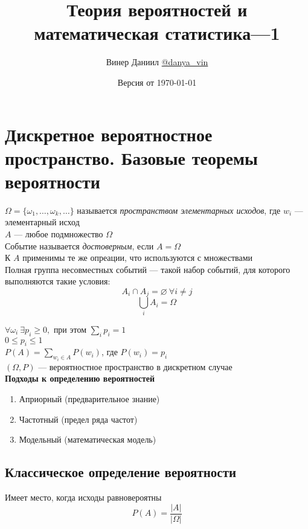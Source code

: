 \documentclass[a4paper, 10pt]{article}
\title{\LARGE{Теория вероятностей и математическая статистика—1}}
\author{Винер Даниил  \href{https://t.me/danya_vin}{@danya\_vin}}
\date{Версия от \today}
\begin{document}
\maketitle
\tableofcontents
\setlength{\parindent}{15pt}
\setlength{\parskip}{2mm}
\newpage
\section{Дискретное вероятностное пространство. Базовые теоремы вероятности}
 $\Omega=\{\omega_1,\ldots,\omega_k,\ldots\}$ называется \textit{пространством элементарных исходов}, где $w_i$ — элементарный исход\\[2mm]
 $A$ — любое подмножество $\Omega$\\[2mm]
 Событие называется \textit{достоверным}, если $A=\Omega$\\[2mm]
\comment К $A$ применимы те же опреации, что используются с множествами\\[2mm]
 Полная группа несовместных событий — такой набор событий, для которого выполняются такие условия:
\begin{equation*}
    A_i\cap A_j=\varnothing\ \forall i\ne j
\end{equation*}
\begin{equation*}
    \displaystyle\bigcup\limits_i A_i=\Omega
\end{equation*}

\axiom $\forall \omega_i\ \exists p_i\geqslant0,$ при этом $\displaystyle\sum_i p_i=1$\\[2mm]
\corollary $0\leqslant p_i\leqslant1$\\[2mm]
 $P(A)=\sum_{w_i\in A} P(w_i)$, где $P(w_i)=p_i$\\[2mm]
\indent $(\Omega, P)$ — вероятностное пространство в дискретном случае\\[2mm]
\textbf{Подходы к определению вероятностей}
\begin{enumerate}
    \item Априорный (предварительное знание)
    \item Частотный (предел ряда частот)
    \item Модельный (математическая модель)
\end{enumerate}
\subsection{Классическое определение вероятности}
\indent Имеет место, когда исходы равновероятны\\[2mm]
$$P(A)=\displaystyle\frac{|A|}{|\Omega|}$$
\end{document}

